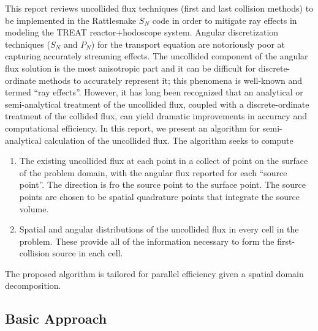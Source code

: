 \documentclass[12pt]{scrartcl}
\begin{document}
\par
This report reviews uncollided flux techniques (first and last collision methods) to be implemented in 
the Rattlesnake $S_N$ code in order to mitigate ray effects in modeling the TREAT reactor+hodoscope system. Angular
discretization techniques ($S_N$ and $P_N$) for the transport equation are notoriously poor at capturing accurately
streaming effects. The uncollided component of the angular flux solution is the most anisotropic part and it can be
difficult for discrete-ordinate methods to accurately represent it; this phenomena is well-known and termed ``ray effects''.
However, it has long been recognized that an analytical or semi-analytical treatment of the uncollided flux, coupled with a discrete-ordinate treatment of the collided flux, can yield dramatic improvements in accuracy and computational efficiency. In this report, we present an algorithm for semi-analytical calculation of the uncollided flux. The algorithm seeks to compute
\begin{enumerate}
\item The existing uncollided flux at each point in a collect of point on the surface of the problem domain, with the angular flux reported for each ``source point''. The direction is fro the source point to the surface point. The source points are chosen to be spatial quadrature points that integrate the source volume.
\item Spatial and angular distributions of the uncollided flux in every cell in the problem. These provide all of the information necessary to form the first-collision source in each cell.
\end{enumerate}
The proposed algorithm is tailored for parallel efficiency given a spatial domain decomposition.

\subsection{Basic Approach}
\end{document}
